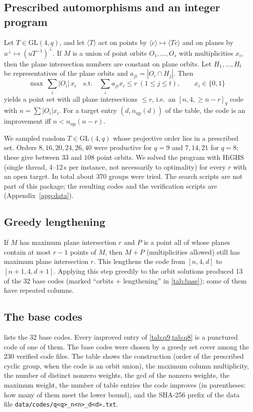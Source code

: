 \documentclass[11pt]{article}
\numberwithin{equation}{section}
\theoremstyle{definition}
\theoremstyle{remark}
\newcommand{\GL}{\mathrm{GL}}
\begin{document}
\subsection{Prescribed automorphisms and an integer program}
Let $T\in\GL(4,q)$, and let $\langle T\rangle$ act on points by $\langle c\rangle\mapsto\langle Tc\rangle$
and on planes by $u^\perp\mapsto (uT^{-1})^\perp$. If $M$ is a union of point orbits $O_1,\dots,O_s$
with multiplicities $x_i$, then the plane intersection numbers are constant on plane orbits. Let
$H_1,\dots,H_t$ be representatives of the plane orbits and $a_{ji}=|O_i\cap H_j|$. Then
\[
  \max\ \sum_{i} |O_i|\,x_i \quad\text{s.t.}\quad \sum_i a_{ji}x_i\le r\ (1\le j\le t),\qquad x_i\in\{0,1\}
\]
yields a point set with all plane intersections $\le r$, i.e.\ an $[n,4,\ge n-r]_q$ code with
$n=\sum|O_i|x_i$. For a target entry $(d,n_{\mathrm{up}}(d))$ of the table, the code is an
improvement iff $n<n_{\mathrm{up}}(n-r)$.

We sampled random $T\in\GL(4,q)$ whose projective order lies in a prescribed set. Orders $8,16,20,24,26,40$
were productive for $q=9$ and $7,14,21$ for $q=8$; these give between $33$ and $108$ point orbits.
We solved the program with HiGHS (single thread, 4--12\,s per instance, not necessarily to
optimality) for every $r$ with an open target. In total about 370 groups were tried. The search
scripts are not part of this package; the resulting codes and the verification scripts are
(Appendix~\ref{app:data}).

\subsection{Greedy lengthening}
If $M$ has maximum plane intersection $r$ and $P$ is a point all of whose planes contain at most
$r-1$ points of $M$, then $M+P$ (multiplicities allowed) still has maximum plane intersection $r$.
This lengthens the code from $[n,4,d]$ to $[n+1,4,d+1]$. Applying this step greedily to the orbit
solutions produced 13 of the 32 base codes (marked ``orbits + lengthening'' in
\cref{tab:base}); some of them have repeated columns.

\subsection{The base codes}
 lists the 32 base codes. Every improved entry of \cref{tab:q9,tab:q8} is a punctured
code of one of them. The base codes were chosen by a greedy set cover among the $230$ verified code files.
The table shows the construction (order of the prescribed cyclic group, when the code is an orbit
union), the maximum column multiplicity, the number of distinct nonzero weights, the gcd of the nonzero
weights, the maximum weight, the number of table entries the code improves (in parentheses: how many of
them meet the lower bound), and the SHA-256 prefix of the data file
\texttt{data/codes/q<q>\_n<n>\_d<d>.txt}.
\end{document}
